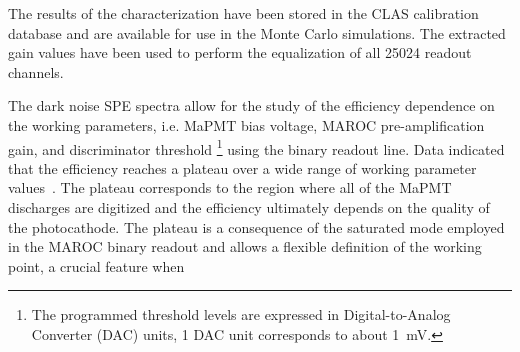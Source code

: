 \documentclass[5p,times,twocolumn]{elsarticle}
\begin{document}
The results of the characterization have been stored in the CLAS calibration database and are available for use in
the Monte Carlo simulations. The extracted gain values have been used to perform the equalization of all 25024
readout channels.


The dark noise SPE spectra allow for the study of the efficiency dependence on the working parameters, i.e. MaPMT
bias voltage, MAROC pre-amplification gain, and discriminator threshold \footnote{The programmed threshold
levels are expressed in Digital-to-Analog Converter (DAC) units, 1 DAC unit corresponds to about 1~mV.} using the
binary readout line. Data indicated that the efficiency reaches a plateau over a wide range of working parameter
values~\cite{Ref:RICHElectro}. %
The plateau corresponds to the region where all of the MaPMT discharges  are digitized and the efficiency ultimately
depends on the quality of the photocathode. The plateau is a consequence of the saturated mode employed in the
MAROC binary readout and allows a flexible definition of the working point, a crucial feature when 
\end{document}
